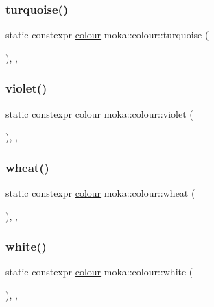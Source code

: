 \subsubsection{\texorpdfstring{turquoise()}{turquoise()}}
{\footnotesize\ttfamily static constexpr \mbox{\hyperlink{classmoka_1_1colour}{colour}} moka\+::colour\+::turquoise (\begin{DoxyParamCaption}{ }\end{DoxyParamCaption})\hspace{0.3cm}{\ttfamily [inline]}, {\ttfamily [static]}, {\ttfamily [noexcept]}}

\mbox{\label{classmoka_1_1colour_a4c268c609b54c0fcb4e7dd9b288a5ed9}} 
\subsubsection{\texorpdfstring{violet()}{violet()}}
{\footnotesize\ttfamily static constexpr \mbox{\hyperlink{classmoka_1_1colour}{colour}} moka\+::colour\+::violet (\begin{DoxyParamCaption}{ }\end{DoxyParamCaption})\hspace{0.3cm}{\ttfamily [inline]}, {\ttfamily [static]}, {\ttfamily [noexcept]}}

\mbox{\label{classmoka_1_1colour_a15e29561e4b6bd5157d2fbeb1c641172}} 
\subsubsection{\texorpdfstring{wheat()}{wheat()}}
{\footnotesize\ttfamily static constexpr \mbox{\hyperlink{classmoka_1_1colour}{colour}} moka\+::colour\+::wheat (\begin{DoxyParamCaption}{ }\end{DoxyParamCaption})\hspace{0.3cm}{\ttfamily [inline]}, {\ttfamily [static]}, {\ttfamily [noexcept]}}

\mbox{\label{classmoka_1_1colour_a78d1ca0cbb00a90472e76c8841804db1}} 
\subsubsection{\texorpdfstring{white()}{white()}}
{\footnotesize\ttfamily static constexpr \mbox{\hyperlink{classmoka_1_1colour}{colour}} moka\+::colour\+::white (\begin{DoxyParamCaption}{ }\end{DoxyParamCaption})\hspace{0.3cm}{\ttfamily [inline]}, {\ttfamily [static]}, {\ttfamily [noexcept]}}

